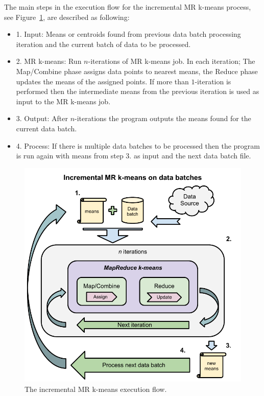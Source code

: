 The main steps in the execution flow for the incremental MR k-means process, see Figure~\ref{fig:mrkmeansprocess}, are described as following:
\begin{itemize}
\item 1. Input: Means or centroids found from previous data batch processing iteration and the current batch of data to be processed.
\item 2. MR k-means: Run $n$-iterations of MR k-means job. In each iteration; The Map/Combine phase assigns data points to nearest means, the Reduce phase updates the means of the assigned points. If more than $1$-iteration is performed then the intermediate means from the previous iteration is used as input to the MR k-means job.
\item 3. Output: After $n$-iterations the program outputs the means found for the current data batch.
\item 4. Process: If there is multiple data batches to be processed then the program is run again with means from step 3. as input and the next data batch file.
\end{itemize}

\begin{figure}[ht]
\centering
\includegraphics[width=1.0\textwidth]{Figures/IncrementalMRKmeansExecutionProcess.pdf}
\caption{The incremental MR k-means execution flow.}
\label{fig:mrkmeansprocess}
\end{figure}


